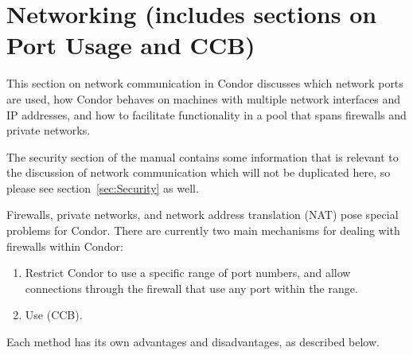 \section{\label{sec:Networking}Networking (includes sections on Port Usage and CCB)}

This section on
network communication in Condor
discusses which network ports are used,
how Condor behaves on machines with multiple network interfaces
and IP addresses,
and how to facilitate functionality in a pool that spans
firewalls and private networks.

The security section of the manual contains some
information that is relevant to the discussion of network
communication which will not be duplicated here, so please
see section~\ref{sec:Security} as well.

Firewalls, private networks, and network address translation (NAT)
pose special problems for Condor.
There are currently two main mechanisms for dealing with firewalls
within Condor:

\begin{enumerate}

\item Restrict Condor to use a specific range of port numbers, and
  allow connections through the firewall that use any port within the
  range.

\item Use  (CCB).

\end{enumerate}

Each method has its own advantages and disadvantages,
as described below.












